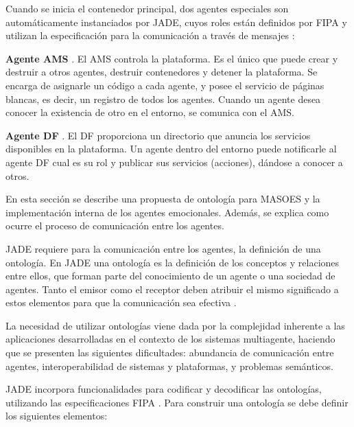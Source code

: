 Cuando se inicia el contenedor principal, dos agentes especiales son automáticamente
instanciados por JADE, cuyos roles están definidos por FIPA y utilizan
la especificación  para la comunicación a través de mensajes
\citep{fipaAgentManagement}:

\textbf{Agente AMS} . El AMS  controla la plataforma.
Es el único que puede crear y destruir a otros agentes, destruir contenedores y detener la plataforma.
Se encarga de asignarle un código a cada agente, y posee el servicio de páginas blancas, es decir,
un registro de todos los agentes. Cuando un agente desea conocer la existencia de otro
en el entorno, se comunica con el AMS.

\textbf{Agente DF} . El DF proporciona un directorio que
anuncia los servicios disponibles en la plataforma.
Un agente dentro del
entorno puede notificarle al agente DF cual es su rol y publicar
sus servicios (acciones), dándose a conocer a otros.


\label{propuesta-nivel-individual}

En esta sección se describe una propuesta de ontología para MASOES
y la implementación interna de los agentes emocionales.
Además, se explica como ocurre el proceso de comunicación entre los agentes.


\label{propuesta-ontologia}

JADE requiere para la comunicación entre los agentes, la definición de una ontología.
En JADE una ontología es la definición de los conceptos y relaciones entre ellos, que forman parte
del conocimiento de un agente o una sociedad de agentes. Tanto el emisor como el receptor deben atribuir el
mismo significado a estos elementos para que la comunicación sea efectiva \citep{bellifemine2007developing}.

La necesidad de utilizar ontologías viene dada por la complejidad inherente a
las aplicaciones desarrolladas en el contexto de los sistemas multiagente, haciendo
que se presenten las siguientes dificultades: abundancia de comunicación
entre agentes, interoperabilidad de sistemas y plataformas, y problemas
semánticos.

JADE incorpora funcionalidades para codificar y decodificar las ontologías,
utilizando las especificaciones FIPA \citep{fipaOntology, fipaLanguage}.
Para construir una ontología se debe definir los siguientes elementos:

